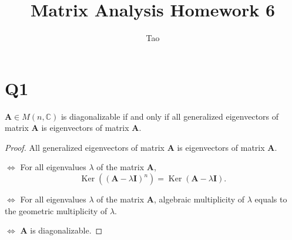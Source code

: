 \documentclass[12pt]{homework}
\title{Matrix Analysis \quad Homework 6}
\author{Tao}
\institute{School of Mathematics}
\begin{document}
\maketitle

\section*{Q1}
\begin{proposition}
    $\mathbf{A} \in M(n, \mathbb{C})$ is diagonalizable if and only if all generalized eigenvectors of matrix $\mathbf{A}$ is eigenvectors of matrix $\mathbf{A}$.
\end{proposition}

\begin{proof}
    All generalized eigenvectors of matrix $\mathbf{A}$ is eigenvectors of matrix $\mathbf{A}$. 
    
    $\Leftrightarrow$
    For all eigenvalues $\lambda$ of the matrix $\mathbf{A}$, 
    \begin{equation*}
        \operatorname{Ker}\left( (\mathbf{A} - \lambda \mathbf{I})^n \right) =  \operatorname{Ker}\left(\mathbf{A} - \lambda \mathbf{I} \right) .
    \end{equation*}

    $\Leftrightarrow$ For all eigenvalues $\lambda$ of the matrix $\mathbf{A}$, algebraic multiplicity of $\lambda$ equals to the geometric multiplicity  of $\lambda$.

    $\Leftrightarrow$ $\mathbf{A}$ is diagonalizable.

\end{proof}
\end{document}
